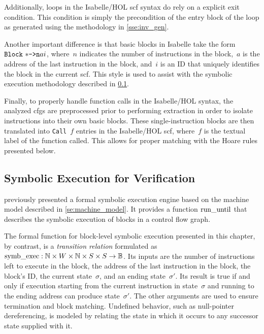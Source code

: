 Additionally, loops in the Isabelle/HOL \ac{scf} syntax
do rely on a explicit exit condition.
This condition is simply the precondition of the entry block of the loop
as generated using the methodology in \cref{sse:inv_gen}.

Another important difference is that basic blocks in Isabelle
take the form $\texttt{Block}~\mathtt{*\texttt{->}n}{a}{i}$,
where~$n$ indicates the number of instructions in the block,~$a$ is the address
of the last instruction in the block, and~$i$ is an ID
that uniquely identifies the block in the current \ac{scf}.
This style is used to assist with the symbolic execution methodology described in
\cref{sse:syntax_ver_symb}.

Finally, to properly handle function calls in the Isabelle/HOL syntax,
the analyzed \acp{cfg} are preprocessed prior to performing extraction
in order to isolate  instructions into their own basic blocks.
These single-instruction blocks are then translated into \texttt{Call}~$f$ entries
in the Isabelle/HOL \ac{scf}, where~$f$ is the textual label of the function called.
This allows for proper matching with the Hoare rules presented below.

\subsection{Symbolic Execution for Verification}\label{sse:syntax_ver_symb}
 previously presented a formal symbolic execution engine
based on the machine model described in \cref{se:machine_model}.
It provides a function $\operatorname{run\_until}$ that describes the symbolic execution of
blocks in a control flow graph.

The formal function for block-level symbolic execution presented in this chapter,%
by contrast, is a \emph{transition relation}%
 formulated as
$\operatorname{symb\_exec}:\mathbb{N}\times W\times\mathbb{N}\times S\times S\rightarrow\mathbb{B}$.
Its inputs are the number of instructions left to execute in the block,
the address of the last instruction in the block, the block's ID,
the current state~$\sigma$, and an ending state~$\sigma'$.
Its result is true if and only if execution
starting from the current instruction in state~$\sigma$
and running to the ending address can produce state~$\sigma'$.
The other arguments are used to ensure termination and block matching.
Undefined behavior, such as null-pointer dereferencing,
is modeled by relating the state in which it occurs to any successor state
supplied with it.

